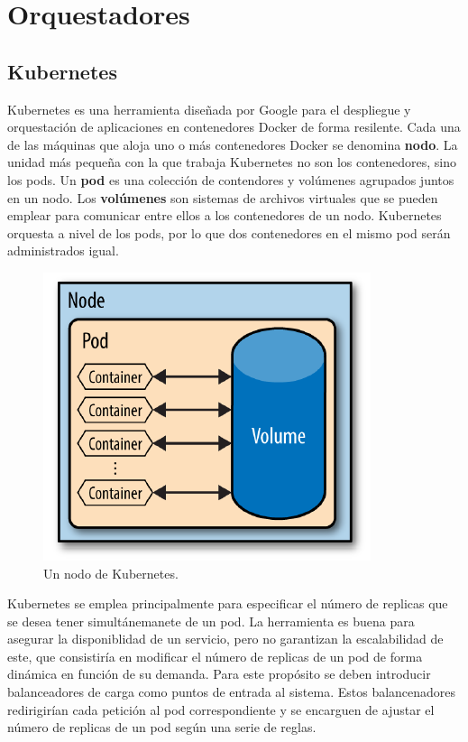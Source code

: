 \documentclass[11pt,spanish,listoffigures]{tfgetsinf}
\begin{document}
\section{Orquestadores}

\subsection{Kubernetes}

Kubernetes es una herramienta diseñada por Google para el despliegue y orquestación de aplicaciones en contenedores Docker de forma resilente. Cada una de las máquinas que aloja uno o más contenedores Docker se denomina \textbf{nodo}. La unidad más pequeña con la que trabaja Kubernetes no son los contenedores, sino los pods. Un \textbf{pod} es una colección de contendores y volúmenes agrupados juntos en un nodo. Los \textbf{volúmenes} son sistemas de archivos virtuales que se pueden emplear para comunicar entre ellos a los contenedores de un nodo. Kubernetes orquesta a nivel de los pods, por lo que dos contenedores en el mismo pod serán administrados igual. \cite{Rensin2015}

\begin{figure}[h]
\centering
\includegraphics[scale=0.7]{kubernetes}
\caption{Un nodo de Kubernetes. \cite{Rensin2015}}
\end{figure}

Kubernetes se emplea principalmente para especificar el número de replicas que se desea tener simultánemanete de un pod. La herramienta es buena para asegurar la disponiblidad de un servicio, pero no garantizan la escalabilidad de este, que consistiría en modificar el número de replicas de un pod de forma dinámica en función de su demanda. Para este propósito se deben introducir balanceadores de carga como puntos de entrada al sistema. Estos balancenadores redirigirían cada petición al pod correspondiente y se encarguen de ajustar el número de replicas de un pod según una serie de reglas.
\end{document}
